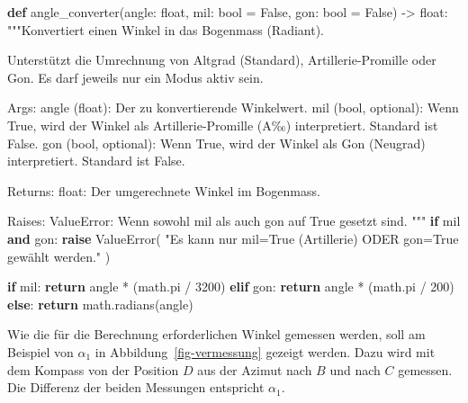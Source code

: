 \documentclass[
  nswissgerman,
  a4paper,
  DIV=11,
  numbers=noendperiod,
  ngerman]{scrreprt}
\newenvironment{Shaded}{\begin{snugshade}}{\end{snugshade}}
\newcommand{\BuiltInTok}[1]{\textcolor[rgb]{0.00,0.23,0.31}{#1}}
\newcommand{\CommentTok}[1]{\textcolor[rgb]{0.37,0.37,0.37}{#1}}
\newcommand{\ControlFlowTok}[1]{\textcolor[rgb]{0.00,0.23,0.31}{\textbf{#1}}}
\newcommand{\DecValTok}[1]{\textcolor[rgb]{0.68,0.00,0.00}{#1}}
\newcommand{\KeywordTok}[1]{\textcolor[rgb]{0.00,0.23,0.31}{\textbf{#1}}}
\newcommand{\NormalTok}[1]{\textcolor[rgb]{0.00,0.23,0.31}{#1}}
\newcommand{\OperatorTok}[1]{\textcolor[rgb]{0.37,0.37,0.37}{#1}}
\newcommand{\PreprocessorTok}[1]{\textcolor[rgb]{0.68,0.00,0.00}{#1}}
\newcommand{\StringTok}[1]{\textcolor[rgb]{0.13,0.47,0.30}{#1}}
\newcommand{\VariableTok}[1]{\textcolor[rgb]{0.07,0.07,0.07}{#1}}
\begin{document}
\begin{Shaded}
\begin{Highlighting}[numbers=left,,]
\KeywordTok{def}\NormalTok{ angle\_converter(angle: }\BuiltInTok{float}\NormalTok{, mil: }\BuiltInTok{bool} \OperatorTok{=} \VariableTok{False}\NormalTok{, gon: }\BuiltInTok{bool} \OperatorTok{=} \VariableTok{False}\NormalTok{) }\OperatorTok{{-}\textgreater{}} \BuiltInTok{float}\NormalTok{:}
    \CommentTok{"""Konvertiert einen Winkel in das Bogenmass (Radiant).}

\CommentTok{    Unterstützt die Umrechnung von Altgrad (Standard), Artillerie{-}Promille}
\CommentTok{    oder Gon. Es darf jeweils nur ein Modus aktiv sein.}

\CommentTok{    Args:}
\CommentTok{        angle (float): Der zu konvertierende Winkelwert.}
\CommentTok{        mil (bool, optional): Wenn True, wird der Winkel als Artillerie{-}Promille}
\CommentTok{            (A‰) interpretiert. Standard ist False.}
\CommentTok{        gon (bool, optional): Wenn True, wird der Winkel als Gon (Neugrad)}
\CommentTok{            interpretiert. Standard ist False.}

\CommentTok{    Returns:}
\CommentTok{        float: Der umgerechnete Winkel im Bogenmass.}

\CommentTok{    Raises:}
\CommentTok{        ValueError: Wenn sowohl \textquotesingle{}mil\textquotesingle{} als auch \textquotesingle{}gon\textquotesingle{} auf True gesetzt sind.}
\CommentTok{    """}
    \ControlFlowTok{if}\NormalTok{ mil }\KeywordTok{and}\NormalTok{ gon:}
        \ControlFlowTok{raise} \PreprocessorTok{ValueError}\NormalTok{(}
            \StringTok{"Es kann nur \textquotesingle{}mil=True\textquotesingle{} (Artillerie) ODER \textquotesingle{}gon=True\textquotesingle{} gewählt werden."}
\NormalTok{        )}

    \ControlFlowTok{if}\NormalTok{ mil:}
        \ControlFlowTok{return}\NormalTok{ angle }\OperatorTok{*}\NormalTok{ (math.pi }\OperatorTok{/} \DecValTok{3200}\NormalTok{)}
    \ControlFlowTok{elif}\NormalTok{ gon:}
        \ControlFlowTok{return}\NormalTok{ angle }\OperatorTok{*}\NormalTok{ (math.pi }\OperatorTok{/} \DecValTok{200}\NormalTok{)}
    \ControlFlowTok{else}\NormalTok{:}
        \ControlFlowTok{return}\NormalTok{ math.radians(angle)}
\end{Highlighting}
\end{Shaded}

Wie die für die Berechnung erforderlichen Winkel gemessen werden, soll
am Beispiel von \(\alpha_1\) in Abbildung~\ref{fig-vermessung} gezeigt
werden. Dazu wird mit dem Kompass von der Position \(D\) aus der Azimut
nach \(B\) und nach \(C\) gemessen. Die Differenz der beiden Messungen
entspricht \(\alpha_1\).
\end{document}
